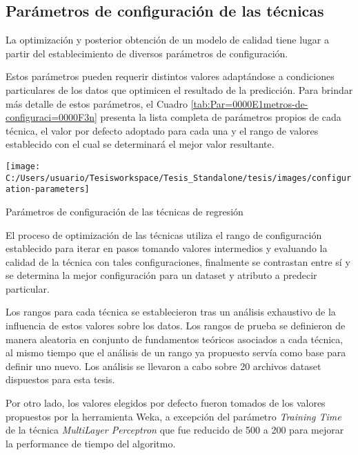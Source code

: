 \subsection{Parámetros de configuración de las técnicas\label{subsec:Par=0000E1metros-de-configuraci=0000F3nde}}

La optimización y posterior obtención de un modelo de calidad tiene
lugar a partir del establecimiento de diversos parámetros de configuración. 

Estos parámetros pueden requerir distintos valores adaptándose a condiciones
particulares de los datos que optimicen el resultado de la predicción.
Para brindar más detalle de estos parámetros, el Cuadro \ref{tab:Par=0000E1metros-de-configuraci=0000F3n}
presenta la lista completa de parámetros propios de cada técnica,
el valor por defecto adoptado para cada una y el rango de valores
establecido con el cual se determinará el mejor valor resultante. 

\begin{table}[H]
\begin{centering}
\texttt{[image: C:/Users/usuario/Tesisworkspace/Tesis\_Standalone/tesis/images/configuration-parameters]}
\par\end{centering}

\caption{Parámetros de configuración de las técnicas de regresión \label{tab:Par=0000E1metros-de-configuraci=0000F3n}}
\end{table}


El proceso de optimización de las técnicas utiliza el rango de configuración
establecido para iterar en pasos tomando valores intermedios y evaluando
la calidad de la técnica con tales configuraciones, finalmente se
contrastan entre sí y se determina la mejor configuración para un
dataset y atributo a predecir particular. 

Los rangos para cada técnica se establecieron tras un análisis exhaustivo
de la influencia de estos valores sobre los datos. Los rangos de prueba
se definieron de manera aleatoria en conjunto de fundamentos teóricos
asociados a cada técnica, al mismo tiempo que el análisis de un rango
ya propuesto servía como base para definir uno nuevo. Los análisis
se llevaron a cabo sobre 20 archivos dataset dispuestos para esta
tesis. 

Por otro lado, los valores elegidos por defecto fueron tomados de
los valores propuestos por la herramienta Weka, a excepción del parámetro
\emph{Training Time} de la técnica \emph{MultiLayer Perceptron} que
fue reducido de 500 a 200 para mejorar la performance de tiempo del
algoritmo. 

